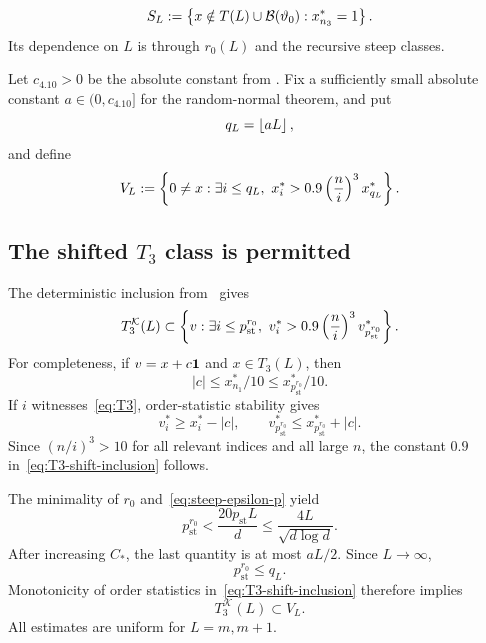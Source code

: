 \begin{definition}\label{def:gradual-class}
\begin{equation}\label{eq:gradual-class}
  S_L:=\left\{x\notin T(L)\cup\mathcal B(\vartheta_0):x_{n_3}^*=1\right\}.
\end{equation}
Its dependence on $L$ is through $r_0(L)$ and the recursive steep classes.
\end{definition}

Let $c_{4.10}>0$ be the absolute constant from \cite[Lemma~4.10]{LLTTY21}. Fix a sufficiently small absolute constant $a\in(0,c_{4.10}]$ for the random-normal theorem, and put
\begin{equation}\label{eq:qL}
  q_L=\left\lfloor aL\right\rfloor,
\end{equation}
and define
\begin{equation}\label{eq:VL}
  V_L:=\set{0\ne x:\exists i\le q_L,\ 
  x_i^*>0.9\left(\frac ni\right)^3x_{q_L}^*}.
\end{equation}

\subsection{\texorpdfstring{The shifted $T_3$ class is permitted}{The shifted T3 class is permitted}}

The deterministic inclusion from~\cite[Section~4.1, equation~(8)]{LLTTY19} gives
\begin{equation}\label{eq:T3-shift-inclusion}
  T_3^{\mathcal K}(L)
  \subset
  \set{v:\exists i\le p_{\mathrm{st}}^{r_0},\ 
  v_i^*>0.9\left(\frac ni\right)^3v_{p_{\mathrm{st}}^{r_0}}^*}.
\end{equation}
For completeness, if $v=x+c\mathbf 1$ and $x\in T_3(L)$, then
\[
  |c|\le x_{n_1}^*/10\le x_{p_{\mathrm{st}}^{r_0}}^*/10.
\]
If $i$ witnesses~\eqref{eq:T3}, order-statistic stability gives
\[
  v_i^*\ge x_i^*-|c|,
  \qquad
  v_{p_{\mathrm{st}}^{r_0}}^*\le x_{p_{\mathrm{st}}^{r_0}}^*+|c|.
\]
Since $(n/i)^3>10$ for all relevant indices and all large $n$, the constant $0.9$ in~\eqref{eq:T3-shift-inclusion} follows.

The minimality of $r_0$ and~\eqref{eq:steep-epsilon-p} yield
\begin{equation}\label{eq:pr0-upper}
  p_{\mathrm{st}}^{r_0}<\frac{20p_{\mathrm{st}}L}{d}
  \le\frac{4L}{\sqrt{d\log d}}.
\end{equation}
After increasing $C_*$, the last quantity is at most $aL/2$. Since $L\to\infty$,
\begin{equation}\label{eq:pr0-qL}
  p_{\mathrm{st}}^{r_0}\le q_L.
\end{equation}
Monotonicity of order statistics in~\eqref{eq:T3-shift-inclusion} therefore implies
\begin{equation}\label{eq:T3-in-VL}
  T_3^{\mathcal K}(L)\subset V_L.
\end{equation}
All estimates are uniform for $L=m,m+1$.

